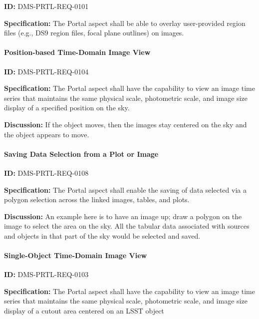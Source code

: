 \documentclass[SE,toc,lsstdraft]{lsstdoc}
\begin{document}
\label{DMS-PRTL-REQ-0101}
\textbf{ID:} DMS-PRTL-REQ-0101

\textbf{Specification:}
The Portal aspect shall be able to overlay user-provided region files (e.g., DS9 region files, focal plane outlines) on images.

\paragraph{Position-based Time-Domain Image View}\hfill  %

\label{DMS-PRTL-REQ-0104}
\textbf{ID:} DMS-PRTL-REQ-0104

\textbf{Specification:}
The Portal aspect shall have the capability to view an image time series that maintains the same physical scale, photometric scale, and image size display of a specified position on the sky.

\textbf{Discussion:}
If the object moves, then the images stay centered on the sky and the object appears to move.

\paragraph{Saving Data Selection from a Plot or Image}\hfill  %

\label{DMS-PRTL-REQ-0108}
\textbf{ID:} DMS-PRTL-REQ-0108

\textbf{Specification:}
The Portal aspect shall enable the saving of data selected via a polygon selection across the linked images, tables, and plots.

\textbf{Discussion:}
An example here is to have an image up; draw a polygon on the image to select the area on the sky.  All the tabular data associated with sources and objects in that part of the sky would be selected and saved.

\paragraph{Single-Object Time-Domain Image View}\hfill  %

\label{DMS-PRTL-REQ-0103}
\textbf{ID:} DMS-PRTL-REQ-0103

\textbf{Specification:}
The Portal aspect shall have the capability to view an image time series that maintains the same physical scale, photometric scale, and image size display of a cutout area centered on an LSST object
\end{document}

